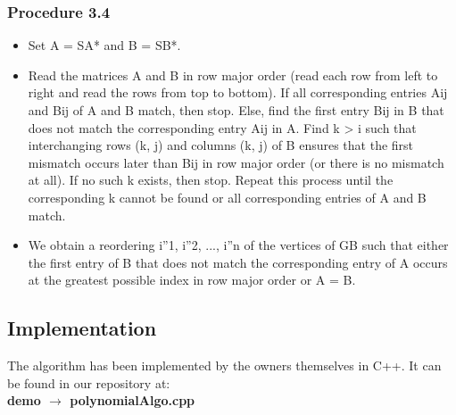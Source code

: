 \documentclass[11pt]{article}
\begin{document}
\subsubsection{Procedure 3.4}
\begin{itemize}
    \item Set A = SA* and  B = SB*.
    \item Read the matrices A and B in row major order (read each row from left to right and read the rows from top to bottom). If all corresponding entries Aij and Bij of A and B match, then stop. Else, find the first entry Bij in B that does not match the corresponding entry Aij in A. Find k > i such that interchanging rows (k, j) and columns (k, j) of B ensures that the first mismatch occurs later than Bij in row major order (or there is no mismatch at all). If no such k exists, then stop. Repeat this process until the corresponding k cannot be found or all corresponding entries of A and B match.
\item We obtain a reordering i''1, i''2, ..., i''n of the vertices of GB such that either the first entry of B that does not match the corresponding entry of A occurs at the greatest possible index in row major order or A = B.

\end{itemize}
\subsection{Implementation}
The algorithm has been implemented by the owners themselves in C++. It can be found in our repository at:\\
\textbf{demo $\rightarrow$ polynomialAlgo.cpp}
\end{document}
